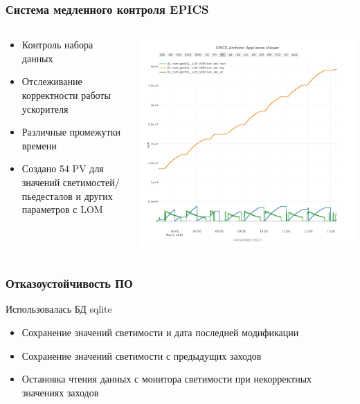 \documentclass{beamer}
\begin{document}
\begin{frame}
\frametitle{Система медленного контроля EPICS}
    \begin{columns}
        \begin{column}{0.5\textwidth}
            \begin{itemize}
                \item Контроль набора данных
                \item Отслеживание корректности работы ускорителя
                \item Различные промежутки времени
                \item Создано 54 PV для значений светимостей/пьедесталов и других параметров с LOM
            \end{itemize}
        \end{column}
        \begin{column}{0.5\textwidth}
            \includegraphics[width=\textwidth]{Int_lum.jpeg}
        \end{column}
    \end{columns}
\end{frame}


\begin{frame}
\frametitle{Отказоустойчивость ПО}
    Использовалась БД sqlite
    \begin{itemize}
        \item Сохранение значений светимости и дата последней модификации
        \item Сохранение значений светимости с предыдущих заходов
        \item Остановка чтения данных с монитора светимости при некорректных значениях заходов
    \end{itemize}
\end{frame}
\end{document}

